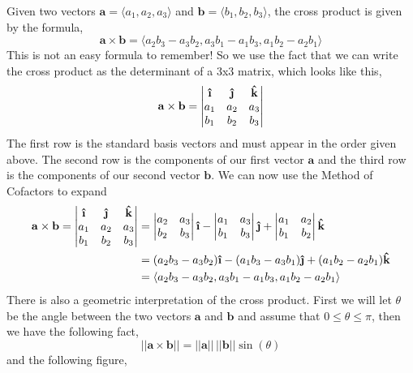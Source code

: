 \documentclass[10pt,reqno]{book}
\theoremstyle{definition}
\renewcommand{\vec}[1]{\mathbf{#1}}
\newcommand{\uvec}[1]{\boldsymbol{\hat{\textbf{#1}}}}
\begin{document}
	Given two vectors $\vec{a} = \langle a_1,a_2,a_3 \rangle$ and $\vec{b} = \langle b_1, b_2, b_3 \rangle$, the cross product is given by the formula,
	\[ \vec{a} \times \vec{b} = \langle a_2b_3 - a_3b_2, a_3b_1 - a_1b_3, a_1b_2 - a_2b_1 \rangle \]
	This is not an easy formula to remember! So we use the fact that we can write the cross product as the determinant of a 3x3 matrix, which looks like this,
	\[ \vec{a} \times \vec{b} = 
		\begin{vmatrix}
			\uvec{\i} & \uvec{\j} & \uvec{k} \\
			a_1 & a_2 & a_3 \\
			b_1 & b_2 & b_3
		\end{vmatrix}
	\]
	The first row is the standard basis vectors and must appear in the order given above. The second row is the components of our first vector $\vec{a}$ and the third row is the components of our second vector $\vec{b}$. We can now use the Method of Cofactors to expand
	\begin{align*}
	\vec{a} \times \vec{b} = 
		\begin{vmatrix}
			\uvec{\i} & \uvec{\j} & \uvec{k} \\
			a_1 & a_2 & a_3 \\
			b_1 & b_2 & b_3
		\end{vmatrix} &= 
		\begin{vmatrix}
			a_2 & a_3\\
			b_2 & b_3
		\end{vmatrix}
		\uvec{\i}
		-
		\begin{vmatrix}
			a_1 & a_3 \\
			b_1 & b_3
		\end{vmatrix}
		\uvec{\j}
		+
		\begin{vmatrix}
			a_1 & a_2 \\
			b_1 & b_2
		\end{vmatrix}
		\uvec{k} \\ 
		&= (a_2b_3 - a_3b_2)\uvec{\i} - (a_1b_3 - a_3b_1)\uvec{\j} + (a_1b_2 - a_2b_1)\uvec{k}\\
		&= \langle a_2b_3 - a_3b_2, a_3b_1 - a_1b_3, a_1b_2 - a_2b_1 \rangle
	\end{align*}
	There is also a geometric interpretation of the cross product. First we will let $\theta$ be the angle between the two vectors $\vec{a}$ and $\vec{b}$ and assume that $0 \leq \theta \leq \pi$, then we have the following fact,
	\begin{equation}
		||\vec{a} \times \vec{b}|| = ||\vec{a}|| \, ||\vec{b}|| \sin(\theta) 
	\end{equation}
	and the following figure,
\end{document}

